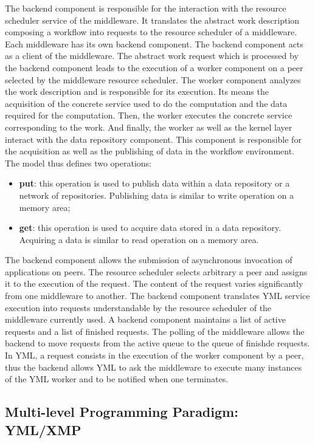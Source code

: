 The backend component is responsible for the interaction with the resource scheduler service of the middleware. It translates the abstract work description composing a workflow into requests to the resource scheduler of a middleware. Each middleware has its own backend component. The backend component acts as a client of the middleware. The abstract work request which is processed by the backend component leads to the execution of a worker component on a peer selected by the middleware resource scheduler. The worker component analyzes the work description and is responsible for its execution. Its means the acquisition of the concrete service used to do the computation and the data required for the computation. Then, the worker executes the concrete service corresponding to the work. And finally, the worker as well as the kernel layer interact with the data repository component. This component is responsible for the acquisition as well as the publishing of data in the workflow environment. The model thus defines two operations:

\begin{itemize}
	\item \textbf{put}: this operation is used to publish data within a data repository or a network of repositories. Publishing data is similar to write operation on a memory area;
	\item \textbf{get}: this operation is used to acquire data stored in a data repository. Acquiring a data is similar to read operation on a memory area.
\end{itemize}

The backend component allows the submission of asynchronous invocation of applications on peers. The resource scheduler selects arbitrary a peer and assigns it to the execution of the request. The content of the request varies significantly from one middleware to another. The backend component translates YML service execution into requests understandable by the resource scheduler of the middleware currently used. A backend component maintains a list of active requests and a list of finished requests. The polling of the middleware allows the backend to move requests from the active queue to the queue of finishde requests. In YML, a request consists in the execution of the worker component by a peer, thus the backend allows YML to ask the middleware to execute many instances of the YML worker and to be notified when one terminates. 


\subsection{Multi-level Programming Paradigm: YML/XMP}


